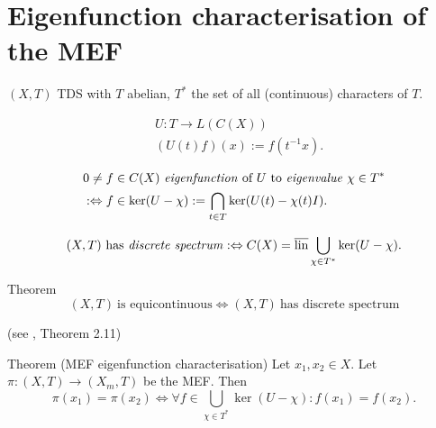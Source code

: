 \section{Eigenfunction characterisation of the MEF}
\begin{frame}
  $(X,T)$ TDS with $T$ abelian, $T^*$ the set of all (continuous) characters of $T$.
\begin{definition}
  \begin{equation*}
    \begin{split}
      &U : T \longrightarrow L(C(X)) \\
      &(U(t) f)(x) := f(t^{-1}x).
    \end{split}
  \end{equation*}
   \end{definition}
   \pause
   \begin{definition}
   \begin{equation*}
    \begin{split}
      &0 \neq f \in C(X) \ \text{\emph{eigenfunction} of} \ U \ \text{to \emph{eigenvalue}} \ \chi \in T^*   \\
 &:\Leftrightarrow f \in \ker (U-\chi):= \bigcap_{t \in T} \ker (U(t)- \chi (t)I).
    \end{split}
      \end{equation*}
   \end{definition}
\end{frame}
\begin{frame}[fragile]
 \begin{definition}
  \begin{equation*}
    (X,T) \ \text{has \emph{discrete spectrum}}:\Leftrightarrow C(X) = \overline{\operatorname{lin}} \bigcup_{\chi \in T^*} \ker (U- \chi).
  \end{equation*}
\end{definition}
\pause 
  \begin{alertblock}{Theorem}%
  \begin{equation*}
    (X,T) \ \text{is equicontinuous} \Leftrightarrow (X,T) \ \text{has discrete spectrum}
  \end{equation*}

    \hfill(see \cite{HK2023}, Theorem 2.11)
\end{alertblock}
\pause
  \begin{alertblock}{Theorem (MEF eigenfunction characterisation)}
  \label{thm:MEF_EFchar}
  Let $x_1,x_2 \in X$. Let $\pi : (X,T) \to (X_m,T)$ be the MEF.
  Then
  \begin{equation*}
  \pi (x_1) = \pi (x_2) \Leftrightarrow 
    \forall f \in \bigcup_{\chi \in T^*} \ker (U- \chi) : f(x_1) = f(x_2).
  \end{equation*}
\end{alertblock}
\end{frame}
